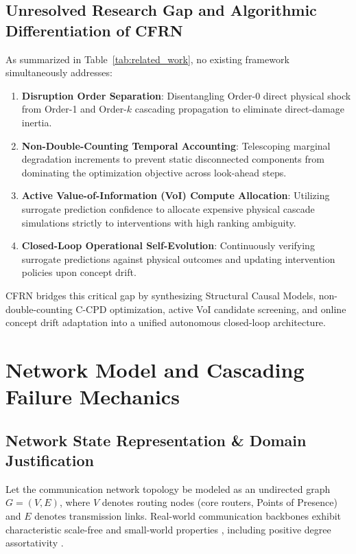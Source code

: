 \documentclass[pdflatex,sn-mathphys-num]{sn-jnl}
\theoremstyle{thmstyleone}
\theoremstyle{thmstyletwo}
\theoremstyle{thmstylethree}
\begin{document}
\subsection{Unresolved Research Gap and Algorithmic Differentiation of CFRN}
As summarized in Table~\ref{tab:related_work}, no existing framework simultaneously addresses:
\begin{enumerate}
    \item \textbf{Disruption Order Separation}: Disentangling Order-0 direct physical shock from Order-1 and Order-$k$ cascading propagation to eliminate direct-damage inertia.
    \item \textbf{Non-Double-Counting Temporal Accounting}: Telescoping marginal degradation increments to prevent static disconnected components from dominating the optimization objective across look-ahead steps.
    \item \textbf{Active Value-of-Information (VoI) Compute Allocation}: Utilizing surrogate prediction confidence to allocate expensive physical cascade simulations strictly to interventions with high ranking ambiguity.
    \item \textbf{Closed-Loop Operational Self-Evolution}: Continuously verifying surrogate predictions against physical outcomes and updating intervention policies upon concept drift.
\end{enumerate}

CFRN bridges this critical gap by synthesizing Structural Causal Models, non-double-counting C-CPD optimization, active VoI candidate screening, and online concept drift adaptation into a unified autonomous closed-loop architecture.

\section{Network Model and Cascading Failure Mechanics}\label{sec3}

\subsection{Network State Representation \& Domain Justification}
Let the communication network topology be modeled as an undirected graph $G = (V, E)$, where $V$ denotes routing nodes (core routers, Points of Presence) and $E$ denotes transmission links. Real-world communication backbones exhibit characteristic scale-free and small-world properties \cite{watts1998collective,barabasi1999emergence}, including positive degree assortativity \cite{newman2002assortative}.
\end{document}
